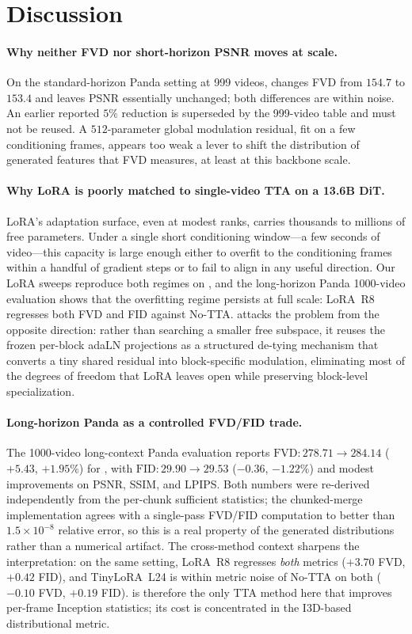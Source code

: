 \section{Discussion}
\label{sec:discussion}

\paragraph{Why neither FVD nor short-horizon PSNR moves at scale.}
On the standard-horizon Panda setting at 999 videos, \method changes FVD from
$154.7$ to $153.4$ and leaves PSNR essentially unchanged; both differences are
within noise. An earlier reported $5\%$ reduction is superseded by the 999-video table
and must not be reused. A $512$-parameter global modulation residual, fit on a few
conditioning frames, appears too weak a lever to shift the distribution of
generated features that FVD measures, at least at this backbone scale.

\paragraph{Why LoRA is poorly matched to single-video TTA on a 13.6B DiT.}
LoRA's adaptation surface, even at modest ranks, carries thousands to
millions of free parameters. Under a single short conditioning window---a
few seconds of video---this capacity is large enough either to overfit to
the conditioning frames within a handful of gradient steps or to fail to
align in any useful direction. Our LoRA sweeps reproduce both regimes on
\backbone, and the long-horizon Panda 1000-video evaluation shows that the
overfitting regime persists at full scale: LoRA~R8 regresses both FVD and
FID against No-TTA. \method attacks the problem from the opposite direction:
rather than searching a smaller free subspace, it reuses the frozen per-block
adaLN projections as a structured de-tying mechanism that converts a tiny
shared residual into block-specific modulation, eliminating most of the
degrees of freedom that LoRA leaves open while preserving block-level
specialization.

\paragraph{Long-horizon Panda as a controlled FVD/FID trade.}
The 1000-video long-context Panda evaluation reports
$\mathrm{FVD}\!:\!278.71\!\to\!284.14$ ($+5.43$, $+1.95\%$) for \method, with
$\mathrm{FID}\!:\!29.90\!\to\!29.53$ ($-0.36$, $-1.22\%$) and modest
improvements on PSNR, SSIM, and LPIPS. Both numbers were re-derived
independently from the per-chunk sufficient statistics; the chunked-merge
implementation agrees with a single-pass FVD/FID computation to better than
$1.5\!\times\!10^{-8}$ relative error, so this is a real property of the
generated distributions rather than a numerical artifact. The cross-method
context sharpens the interpretation: on the same setting, LoRA~R8 regresses
\emph{both} metrics ($+3.70$ FVD, $+0.42$ FID), and TinyLoRA~L24 is within
metric noise of No-TTA on both ($-0.10$ FVD, $+0.19$ FID). \method is
therefore the only TTA method here that improves per-frame Inception
statistics; its cost is concentrated in the I3D-based distributional metric.

